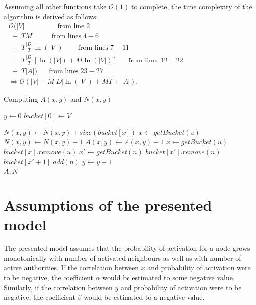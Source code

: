 \documentclass[times, utf8, zavrsni]{fer}
\begin{document}
Assuming all other functions take $\mathcal{O}(1)$ to complete, the time complexity of the algorithm is derived as follows:
\begin{equation*}
\begin{aligned}
\mathcal{O}(|V| \;\;\;\;\;\;\;\;\;\;\;\;\;\;\;\;\; \text{from line}\; 2 \\
          \;    + \;T M  \;\;\;\;\;\;\;\;\;\; \text{from lines} \;4-6 \\
          \;    + \;T \frac{|D|}{T}\ln(|V|)  \;\;\;\;\;\;\;\; \text{from lines} \;7-11 \\
          \;    + \;T \frac{|D|}{T}\left[\ln(|V|) + M\ln(|V|)\right]  \;\;\;\;\;\; \text{from lines} \;12-22 \\
          \;    + \;T |A|) \;\;\;\;\;\; \text{from lines} \; 23-27 \\
\Rightarrow           \mathcal{O}(|V| + M|D|\ln(|V|) + MT + |A|).
\end{aligned}
 \phantom{\hspace{4cm}} 
\end{equation*}

\begin{algorithm}[htp]
\caption{Computing $A(x,y)$ and $N(x,y)$}
\label{algo2}
\begin{algorithmic}[5]
\State $y \gets 0$
\State $bucket[0] \gets V$

       \State $N(x, y) \gets N(x, y) + size(bucket[x])$
   \EndFor
   \State $x \gets getBucket(u)$
   \State $N(x, y) \gets N(x, y) - 1$
   \State $A(x, y) \gets A(x, y) + 1$ 
   \EndFor
   \State $x \gets getBucket(u)$ 
   \State $bucket[x].remove(u)$   
        \State $x' \gets getBucket(n)$
     \State $bucket[x'].remove(n)$    
     \State $bucket[x' + 1].add(n)$
\EndIf     
     \EndFor
     \EndFor
    \State $y \gets y + 1$
    \EndIf 
    \EndFor        
\EndFor \\
\Return $A, N$
\end{algorithmic}
\end{algorithm}

\section{Assumptions of the presented model}
The presented model assumes that the probability of activation for a node grows monotonically with number of activated neighbours as well as with number of active authorities. If the correlation between $x$ and probability of activation were to be negative, the coefficient $\alpha$ would be estimated to some negative value. Similarly, if the correlation between $y$ and probability of activation were to be negative, the coefficient $\beta$ would be estimated to a negative value.
\end{document}
